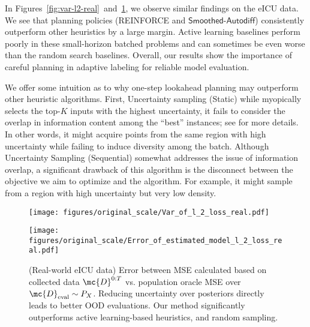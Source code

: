 In Figures~\ref{fig:var-l2-real}~and~\ref{fig:mean-l2-real}, we observe similar findings on the eICU data. We see that planning policies (\textsf{REINFORCE} and $\mathsf{Smoothed\text{-}Autodiff}$) consistently outperform other heuristics by a large margin.  Active learning baselines perform poorly in these small-horizon batched problems and can sometimes be even worse than the random search baselines.  Overall, our results show the importance of careful planning in adaptive labeling for reliable model evaluation. 

We offer some intuition as to why one-step lookahead planning may outperform other heuristic algorithms. 
 First,  \textsf{Uncertainty sampling (Static)} while myopically selects the
 top-$K$ inputs with the highest uncertainty, it fails to consider 
the overlap in information content among the ``best” instances; see \citep{AggarwalKoGuHaPh14} for more details. 
In other words,  it might acquire points from the same region with high uncertainty while failing to induce diversity among the batch.
Although \textsf{Uncertainty Sampling (Sequential)} somewhat addresses the issue of information overlap, a significant drawback of 
this algorithm
is the disconnect between the objective we aim to optimize and the algorithm. For example, it might sample from a region with high uncertainty but very low density. 

\begin{figure}[t]
\centering
\begin{minipage}[b]{0.48\textwidth}
\centering
\texttt{[image: figures/original\_scale/Var\_of\_l\_2\_loss\_real.pdf]}
\caption{(Real-world eICU data) Variance of mean squared loss evaluated through the posterior belief $\mu_t$ at each horizon $t$. Even 1-step lookaheads are extremely effective planners, and auto-differentiation-based pathwise policy gradients provide a reliable optimization algorithm based on low-variance gradient estimates.}
\label{fig:var-l2-real}
\end{minipage}
\hfill
\begin{minipage}[b]{0.48\textwidth}
\centering \texttt{[image: figures/original\_scale/Error\_of\_estimated\_model\_l\_2\_loss\_real.pdf]}
\caption{(Real-world eICU data) Error between MSE calculated based on collected data $\mc{D}^{0:T}$ vs. population oracle MSE over $\mc{D}_{\rm eval} \sim P_X$. Reducing uncertainty over posteriors directly leads to better OOD evaluations. Our method significantly outperforms active learning-based heuristics, and random sampling.}
\label{fig:mean-l2-real}
\end{minipage}
\end{figure}
 
